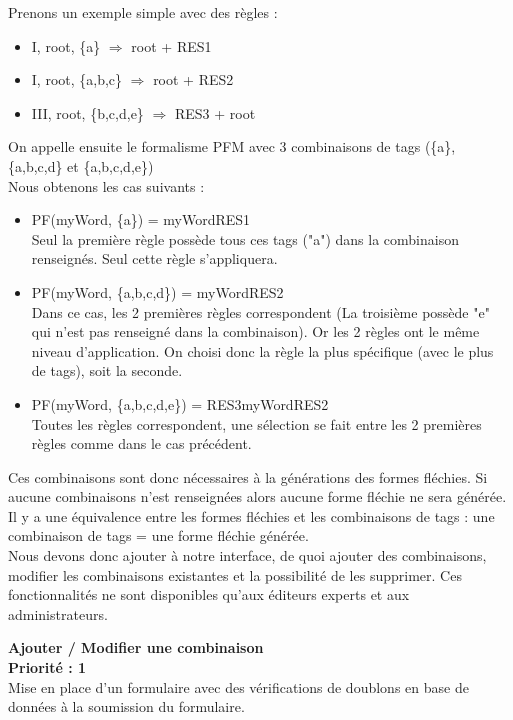 \documentclass[12pt,a4paper]{article}
\begin{document}
\smallbreak

Prenons un exemple simple avec des règles : 
\begin{itemize} 
  \item I, root, \{a\} $\Longrightarrow$ root + RES1
  \item I, root, \{a,b,c\} $\Longrightarrow$ root + RES2
  \item III, root, \{b,c,d,e\} $\Longrightarrow$ RES3 + root
\end{itemize}
On appelle ensuite le formalisme PFM avec 3 combinaisons de tags (\{a\}, \{a,b,c,d\} et \{a,b,c,d,e\}) \\
Nous obtenons les cas suivants :
\begin{itemize}  
  \item PF(myWord, \{a\}) = myWordRES1 \\ 
  Seul la première règle possède tous ces tags ("a") dans la combinaison renseignés. Seul cette règle s'appliquera. 
  \item PF(myWord, \{a,b,c,d\}) = myWordRES2 \\ 
  Dans ce cas, les 2 premières règles correspondent (La troisième possède "e" qui n'est pas renseigné dans la combinaison). Or les 2 règles ont le même niveau d'application. On choisi donc la règle la plus spécifique (avec le plus de tags), soit la seconde.
  \item PF(myWord, \{a,b,c,d,e\}) = RES3myWordRES2 \\
  Toutes les règles correspondent, une sélection se fait entre les 2 premières règles comme dans le cas précédent.
\end{itemize}

\smallbreak

Ces combinaisons sont donc nécessaires à la générations des formes fléchies. Si aucune combinaisons n'est renseignées alors aucune forme fléchie ne sera générée. Il y a une équivalence entre les formes fléchies et les combinaisons de tags : une combinaison de tags = une forme fléchie générée.
\\
Nous devons donc ajouter à notre interface, de quoi ajouter des combinaisons, modifier les combinaisons existantes et la possibilité de les supprimer. Ces fonctionnalités ne sont disponibles qu'aux éditeurs experts et aux administrateurs.

\smallbreak

\textbf{Ajouter / Modifier une combinaison}  \\ 
\textbf{Priorité : 1} \\
Mise en place d'un formulaire avec des vérifications de doublons en base de données à la soumission du formulaire.
\end{document}

